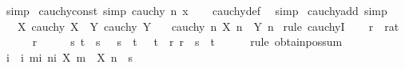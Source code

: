 \begin{isabellebody}
\ simp%
\endisatagproof
{\isafoldproof}%
%
\isadelimproof
\isanewline
%
\endisadelimproof
\isanewline
{}\isamarkupfalse%
\ cauchy{\isacharunderscore}{\kern0pt}const\ {\isacharbrackleft}{\kern0pt}simp{\isacharbrackright}{\kern0pt}{\isacharcolon}{\kern0pt}\ {\isachardoublequoteopen}cauchy\ {\isacharparenleft}{\kern0pt}{\isasymlambda}n{\isachardot}{\kern0pt}\ x{\isacharparenright}{\kern0pt}{\isachardoublequoteclose}\isanewline
%
\isadelimproof
\ \ %
\endisadelimproof
%
\isatagproof
{}\isamarkupfalse%
\ cauchy{\isacharunderscore}{\kern0pt}def\ \isamarkupfalse%
\ simp%
\endisatagproof
{\isafoldproof}%
%
\isadelimproof
\isanewline
%
\endisadelimproof
\isanewline
{}\isamarkupfalse%
\ cauchy{\isacharunderscore}{\kern0pt}add\ {\isacharbrackleft}{\kern0pt}simp{\isacharbrackright}{\kern0pt}{\isacharcolon}{\kern0pt}\isanewline
\ \ \ X{\isacharcolon}{\kern0pt}\ {\isachardoublequoteopen}cauchy\ X{\isachardoublequoteclose}\ \ Y{\isacharcolon}{\kern0pt}\ {\isachardoublequoteopen}cauchy\ Y{\isachardoublequoteclose}\isanewline
\ \ \ {\isachardoublequoteopen}cauchy\ {\isacharparenleft}{\kern0pt}{\isasymlambda}n{\isachardot}{\kern0pt}\ X\ n\ {\isacharplus}{\kern0pt}\ Y\ n{\isacharparenright}{\kern0pt}{\isachardoublequoteclose}\isanewline
%
\isadelimproof
%
\endisadelimproof
%
\isatagproof
{}\isamarkupfalse%
\ {\isacharparenleft}{\kern0pt}rule\ cauchyI{\isacharparenright}{\kern0pt}\isanewline
\ \ \isamarkupfalse%
\ r\ {\isacharcolon}{\kern0pt}{\isacharcolon}{\kern0pt}\ rat\isanewline
\ \ \isamarkupfalse%
\ {\isachardoublequoteopen}{}\ {\isacharless}{\kern0pt}\ r{\isachardoublequoteclose}\isanewline
\ \ \isamarkupfalse%
\ \isamarkupfalse%
\ s\ t\ \ s{\isacharcolon}{\kern0pt}\ {\isachardoublequoteopen}{}\ {\isacharless}{\kern0pt}\ s{\isachardoublequoteclose}\ \ t{\isacharcolon}{\kern0pt}\ {\isachardoublequoteopen}{}\ {\isacharless}{\kern0pt}\ t{\isachardoublequoteclose}\ \ r{\isacharcolon}{\kern0pt}\ {\isachardoublequoteopen}r\ {\isacharequal}{\kern0pt}\ s\ {\isacharplus}{\kern0pt}\ t{\isachardoublequoteclose}\isanewline
\ \ \ \ \isamarkupfalse%
\ {\isacharparenleft}{\kern0pt}rule\ obtain{\isacharunderscore}{\kern0pt}pos{\isacharunderscore}{\kern0pt}sum{\isacharparenright}{\kern0pt}\isanewline
\ \ \isamarkupfalse%
\ i\ \ i{\isacharcolon}{\kern0pt}\ {\isachardoublequoteopen}{\isasymforall}m{\isasymge}i{\isachardot}{\kern0pt}\ {\isasymforall}n{\isasymge}i{\isachardot}{\kern0pt}\ {\isasymbar}X\ m\ {\isacharminus}{\kern0pt}\ X\ n{\isasymbar}\ {\isacharless}{\kern0pt}\ s{\isachardoublequoteclose}\isanewline

\end{isabellebody}
